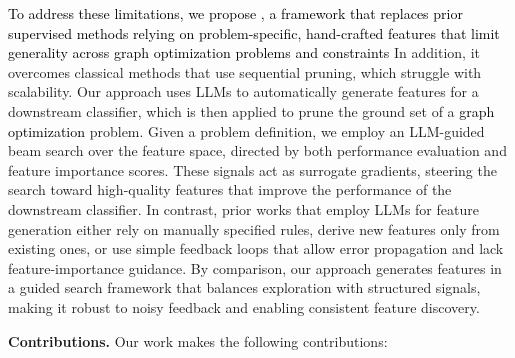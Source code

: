 \textcolor{black}{To address these limitations, we propose \llm, a framework that replaces prior supervised methods relying on problem-specific, hand-crafted features that limit generality across \textcolor{black}{graph optimization problems} and constraints} In addition, it overcomes classical methods that use sequential pruning, which struggle with scalability. Our approach uses LLMs to automatically generate features for a downstream classifier, which is then applied to prune the ground set of a \textcolor{black}{graph optimization} problem. Given a problem definition, we employ an LLM-guided beam search over the feature space, directed by both performance evaluation and feature importance scores. These signals act as surrogate gradients, steering the search toward high-quality features that improve the performance of the downstream classifier. In contrast, prior works that employ LLMs for feature generation either rely on manually specified rules, derive new features only from existing ones, or use simple feedback loops that allow error propagation and lack feature-importance guidance. By comparison, our approach generates features in a guided search framework that balances exploration with structured signals, making it robust to noisy feedback and enabling consistent feature discovery.






\textbf{Contributions.}  
Our work makes the following contributions:  



